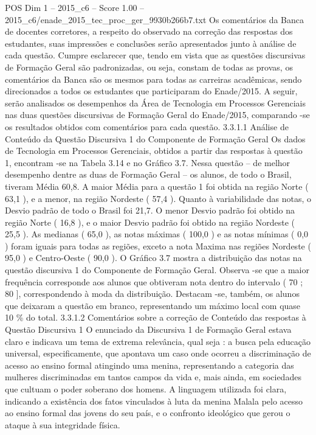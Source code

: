 \begin{textsample}{POS Dim 1 – 2015\_c6 – Score 1.00 – 2015\_c6/enade\_2015\_tec\_proc\_ger\_9930b266b7.txt}
Os comentários da Banca de docentes corretores, a respeito do observado na correção das respostas dos estudantes, suas impressões e conclusões serão apresentados junto à análise de cada questão.
Cumpre esclarecer que, tendo em vista que as questões discursivas de Formação Geral são padronizadas, ou seja, constam de todas as provas, os comentários da Banca são os mesmos para todas as carreiras acadêmicas, sendo direcionados a todos os estudantes que participaram do Enade/2015.
A seguir, serão analisados os desempenhos da Área de Tecnologia em Processos Gerenciais nas duas questões discursivas de Formação Geral do Enade/2015, comparando -se os resultados obtidos com comentários para cada questão. 3.3.1.1 Análise de Conteúdo da Questão Discursiva 1 do Componente de Formação Geral Os dados de Tecnologia em Processos Gerenciais, obtidos a partir das respostas à questão 1, encontram -se na Tabela 3.14 e no Gráfico 3.7.
Nessa questão – de melhor desempenho dentre as duas de Formação Geral – os alunos, de todo o Brasil, tiveram Média 60,8.
A maior Média para a questão 1 foi obtida na região Norte ( 63,1 ), e a menor, na região Nordeste ( 57,4 ).
Quanto à variabilidade das notas, o Desvio padrão de todo o Brasil foi 21,7.
O menor Desvio padrão foi obtido na região Norte ( 16,8 ), e o maior Desvio padrão foi obtido na região Nordeste ( 25,5 ).
As medianas ( 65,0 ), as notas máximas ( 100,0 ) e as notas mínimas ( 0,0 ) foram iguais para todas as regiões, exceto a nota Maxima nas regiões Nordeste ( 95,0 ) e Centro-Oeste ( 90,0 ).
O Gráfico 3.7 mostra a distribuição das notas na questão discursiva 1 do Componente de Formação Geral.
Observa -se que a maior frequência corresponde aos alunos que obtiveram nota dentro do intervalo ( 70 ; 80 ], correspondendo à moda da distribuição.
Destacam -se, também, os alunos que deixaram a questão em branco, representando um máximo local com quase 10 \% do total. 3.3.1.2 Comentários sobre a correção de Conteúdo das respostas à Questão Discursiva 1 O enunciado da Discursiva 1 de Formação Geral estava claro e indicava um tema de extrema relevância, qual seja : a busca pela educação universal, especificamente, que apontava um caso onde ocorreu a discriminação de acesso ao ensino formal atingindo uma menina, representando a categoria das mulheres discriminadas em tantos campos da vida e, mais ainda, em sociedades que cultuam o poder soberano dos homens.
A linguagem utilizada foi clara, indicando a existência dos fatos vinculados à luta da menina Malala pelo acesso ao ensino formal das jovens do seu país, e o confronto ideológico que gerou o ataque à sua integridade física.

\end{textsample}
